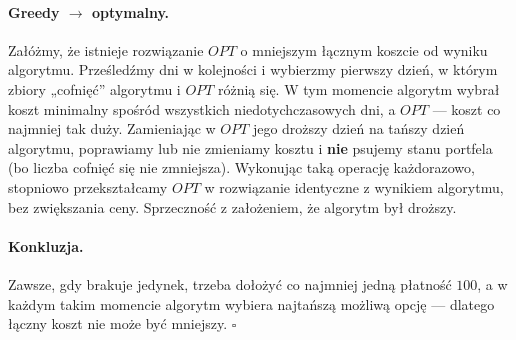 \documentclass[11pt,a4paper]{article}
\begin{document}
\paragraph{Greedy $\to$ optymalny.}
Załóżmy, że istnieje rozwiązanie $OPT$
o mniejszym łącznym koszcie od wyniku algorytmu.
Prześledźmy dni w kolejności
i wybierzmy pierwszy dzień, w którym
zbiory „cofnięć” algorytmu i $OPT$ różnią się.
W tym momencie algorytm wybrał
koszt minimalny spośród wszystkich
niedotychczasowych dni,
a $OPT$ — koszt co najmniej tak duży.
Zamieniając w $OPT$
jego droższy dzień na tańszy dzień algorytmu,
poprawiamy lub nie zmieniamy kosztu i
\textbf{nie} psujemy stanu portfela
(bo liczba cofnięć się nie zmniejsza).
Wykonując taką operację każdorazowo,
stopniowo przekształcamy $OPT$
w rozwiązanie identyczne z wynikiem algorytmu,
bez zwiększania ceny.
Sprzeczność z założeniem, że algorytm był droższy.

\paragraph{Konkluzja.}
Zawsze, gdy brakuje jedynek, trzeba dołożyć
co najmniej jedną płatność $100$,
a w każdym takim momencie algorytm wybiera
najtańszą możliwą opcję —
dlatego łączny koszt nie może być mniejszy.
\hfill$\square$
\end{document}
